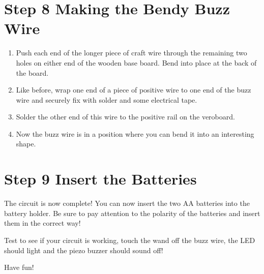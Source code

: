%
\section*{Step 8 Making the Bendy Buzz Wire}

\begin{enumerate}
	\item Push each end of the longer piece of craft wire through the remaining two holes on either end of the wooden base board. Bend into place at the back of the board.
	
	\item Like before, wrap one end of a piece of positive wire to one end of the buzz wire and securely fix with solder and some electrical tape.
	
	\item Solder the other end of this wire to the positive rail on the veroboard.
	
	\item Now the buzz wire is in a position where you can bend it into an interesting shape.	
\end{enumerate}


%
\section*{Step 9 Insert the Batteries}

The circuit is now complete! You can now insert the two AA batteries into the battery holder. Be sure to pay attention to the polarity of the batteries and insert them in the correct way!

Test to see if your circuit is working, touch the wand off the buzz wire, the LED should light and the piezo buzzer should sound off!

Have fun!






